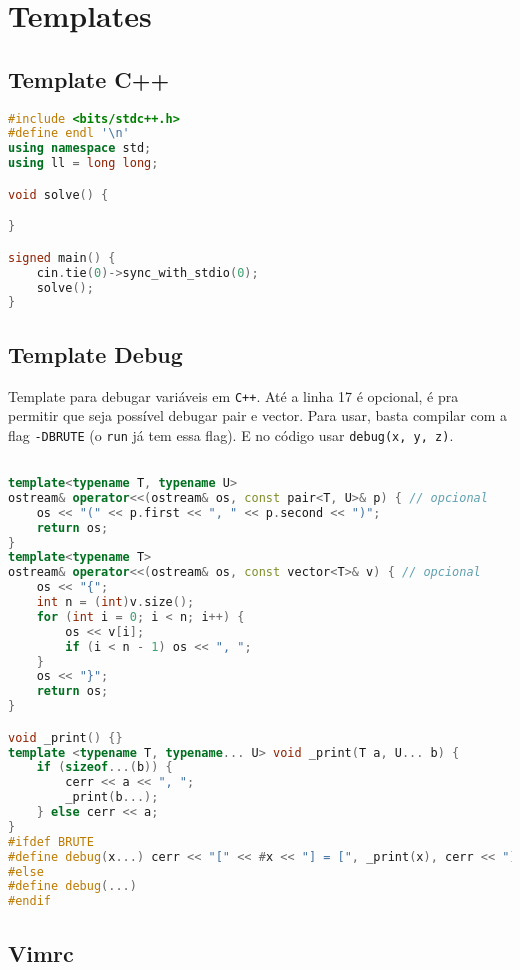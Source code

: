 \chapter{Templates}

\section{Template C++}

\begin{lstlisting}[language=C++]
#include <bits/stdc++.h>
#define endl '\n'
using namespace std;
using ll = long long;

void solve() {

}

signed main() {
    cin.tie(0)->sync_with_stdio(0);
    solve();
}
\end{lstlisting}

\section{Template Debug}

Template para debugar variáveis em \texttt{C++}. Até a linha 17 é opcional, é pra permitir que seja possível debugar pair e vector.
Para usar, basta compilar com a flag \texttt{-DBRUTE} (o \texttt{run} já tem essa flag). E no código usar \texttt{debug(x, y, z)}.

\begin{lstlisting}[language=C++]

template<typename T, typename U> 
ostream& operator<<(ostream& os, const pair<T, U>& p) { // opcional
    os << "(" << p.first << ", " << p.second << ")";
    return os;
}
template<typename T> 
ostream& operator<<(ostream& os, const vector<T>& v) { // opcional
    os << "{";
    int n = (int)v.size();
    for (int i = 0; i < n; i++) {
        os << v[i];
        if (i < n - 1) os << ", ";
    }
    os << "}";
    return os;
}

void _print() {}
template <typename T, typename... U> void _print(T a, U... b) {
    if (sizeof...(b)) {
        cerr << a << ", ";
        _print(b...);
    } else cerr << a;
}
#ifdef BRUTE
#define debug(x...) cerr << "[" << #x << "] = [", _print(x), cerr << "]" << endl
#else
#define debug(...)
#endif
\end{lstlisting}

\section{Vimrc}

